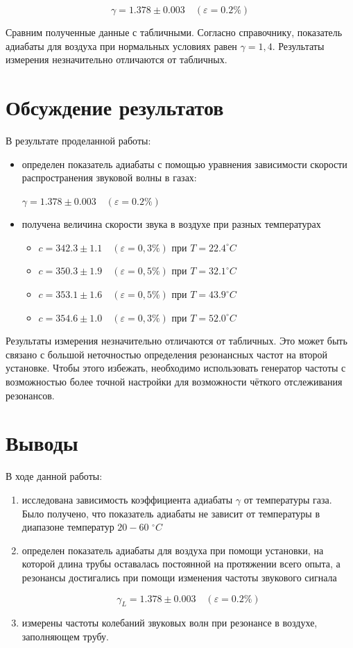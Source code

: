 \documentclass{article}
\begin{document}
\[ \boxed{\gamma = 1.378 \pm 0.003}\quad (\varepsilon=0.2\%) \]

Сравним полученные данные с табличными. Согласно справочнику, показатель адиабаты для воздуха при нормальных условиях равен \underline{$ \gamma = 1,4 $}. Результаты измерения незначительно отличаются от табличных.

\section*{Обсуждение результатов}

В результате проделанной работы:

\begin{itemize}
\item определен показатель адиабаты с помощью уравнения зависимости скорости распространения звуковой волны в газах:

$ \gamma = 1.378 \pm 0.003\quad (\varepsilon=0.2\%) $
\item получена величина скорости звука в воздухе при разных температурах
\begin{itemize}
\item $ c = 342.3 \pm 1.1\quad (\varepsilon=0,3\%) $ при $ T = 22.4^{\circ}C $
\item $ c = 350.3 \pm 1.9\quad (\varepsilon=0,5\%) $ при $ T = 32.1^{\circ}C $
\item $ c = 353.1 \pm 1.6\quad (\varepsilon=0,5\%) $ при $ T = 43.9^{\circ}C $
\item $ c = 354.6 \pm 1.0\quad (\varepsilon=0,3\%) $ при $ T = 52.0^{\circ}C $
\end{itemize}

\end{itemize}

Результаты измерения незначительно отличаются от табличных. Это может быть связано с большой неточностью определения резонансных частот на второй установке. Чтобы этого избежать, необходимо использовать генератор частоты с возможностью более точной настройки для возможности чёткого отслеживания резонансов.

\section*{Выводы}

В ходе данной работы:

\begin{enumerate}
\item исследована зависимость коэффициента адиабаты $ \gamma $ от температуры газа. Было получено, что показатель адиабаты не зависит от температуры в диапазоне температур $ 20-60 $ $ ^\circ C $

\item определен показатель адиабаты для воздуха при помощи установки, на которой длина трубы оставалась постоянной на протяжении всего опыта, а резонансы достигались при помощи изменения частоты звукового сигнала

\[ \boxed{\gamma_L = 1.378 \pm 0.003}\quad (\varepsilon=0.2\%) \]

\item измерены частоты колебаний звуковых волн при резонансе в воздухе, заполняющем трубу.
\end{enumerate}
\end{document}
